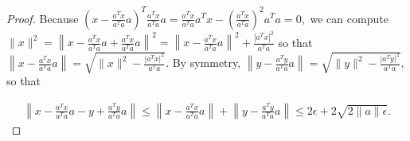 \documentclass{article}
\theoremstyle{case}
\numberwithin{theorem}{subsection}
\begin{document}
\begin{proof}
Because
$
\left(x - \frac{a^Tx}{a^Ta} a\right)^T \frac{a^Tx}{a^Ta} a = \frac{a^Tx}{a^Ta} a^Tx - \left(\frac{a^Tx}{a^Ta}\right)^2a^Ta = 0,
$
we can compute
$
\|x\|^2 = \left\|x - \frac{a^Tx}{a^Ta} a + \frac{a^Tx}{a^Ta} a\right\|^2 = \left\|x - \frac{a^Tx}{a^Ta} a \right\|^2 +\frac{\left|a^Tx\right|^2}{a^Ta}
$
so that 
$
\left\|x - \frac{a^Tx}{a^Ta} a \right\| = \sqrt{\|x\|^2 - \frac{\left|a^Tx\right|^2}{a^Ta}}.
$
By symmetry,
$
\left\|y - \frac{a^Ty}{a^Ta} a \right\| = \sqrt{\|y\|^2 - \frac{\left|a^Ty\right|^2}{a^Ta}},
$
so that

\begin{align*}
\left\|x - \frac{a^Tx}{a^Ta} a - y + \frac{a^Ty}{a^Ta} a \right\|
\le \left\|x - \frac{a^Tx}{a^Ta} a \right\| + \left\|y - \frac{a^Ty}{a^Ta} a \right\|
\le 2\epsilon + 2\sqrt{2\|a\|\epsilon}.
\end{align*}




\end{proof}
\end{document}
